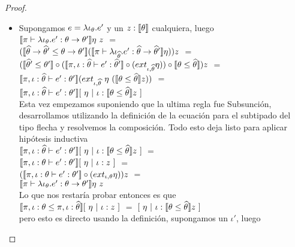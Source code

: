 \begin{proof}
\begin{itemize}
\begin{itemize}
\newpage

\item Supongamos $e = \lambda \iota_{\theta} . e'$ y un $z : \llbracket \theta \rrbracket$ cualquiera, luego\\

$\semBrcks{\pi \vdash \clambda{\iota}{\theta}{e'} : \theta \rightarrow \theta'}\eta \ z$ $=$\\
$(\llbracket \widehat{\theta} \rightarrow \widehat{\theta}' \leq \theta \rightarrow \theta' \rrbracket
(\llbracket \pi \vdash \lambda \iota_{\widehat{\theta}} . e' : \widehat{\theta} \rightarrow \widehat{\theta}' \rrbracket\eta))z$
$=$\\
$(\llbracket \widehat{\theta}' \leq \theta' \rrbracket 
	\circ
(\llbracket \pi,\iota:\widehat{\theta} \vdash e' : \widehat{\theta}' \rrbracket \circ (ext_{\iota,\widehat{\theta}}\eta))
	\circ
\llbracket \theta \leq \widehat{\theta} \rrbracket) z$ $=$\\
$\llbracket \pi,\iota:\widehat{\theta} \vdash e' : \theta' \rrbracket
		(ext_{\iota,\widehat{\theta}} \ \eta \ (\llbracket \theta \leq \widehat{\theta} \rrbracket z))$ $=$\\
$\semBrcks{\pi,\iota:\thetahat \vdash e' : \theta'}
		[ \ \eta \ | \ \iota:\semBrcks{\theta \leq \thetahat}z \ ]$\\

Esta vez empezamos suponiendo que la ultima regla fue Subsunción, desarrollamos
utilizando la definici\'on de la ecuaci\'on para el subtipado del tipo flecha y
resolvemos la composici\'on. Todo esto deja listo para aplicar hip\'otesis inductiva\\

$\semBrcks{\pi,\iota:\thetahat \vdash e' : \theta'}
		[ \ \eta \ | \ \iota:\semBrcks{\theta \leq \thetahat}z \ ]$ $=$\\
$\llbracket \pi,\iota:\theta \vdash e' : \theta' \rrbracket [ \ \eta \ | \ \iota:z \ ]$ $=$\\
$(\llbracket \pi,\iota:\theta \vdash e' : \theta' \rrbracket \circ (ext_{\iota,\theta} \eta)) z$ $=$\\
$\semBrcks{\pi \vdash \clambda{\iota}{\theta}{e'} : \theta \rightarrow \theta'}\eta \ z$\\

Lo que nos restar\'ia probar entonces es que\\

$\llbracket \pi,\iota:\theta \leq \pi,\iota:\widehat{\theta} \rrbracket[ \ \eta \ | \ \iota:z \ ]$ $=$
$[ \ \eta \ | \ \iota:\llbracket \theta \leq \widehat{\theta} \rrbracket z \ ]$\\

pero esto es directo usando la definici\'on, supongamos un $\iota'$, luego


\end{itemize}
\end{itemize}
\end{proof}
